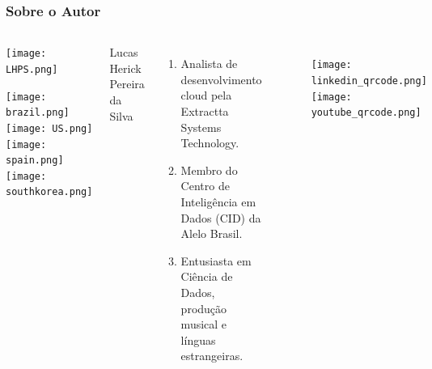 \documentclass[aspectratio=43,8pt]{beamer}%
\begin{document}
\begin{frame}
	\frametitle{Sobre o Autor}
	
	\begin{columns}
		
				
		\begin{center}
	
				\texttt{[image: LHPS.png]}\\
				
				\begin{minipage}{0.7\linewidth}
				\texttt{[image: brazil.png]}
				\hfill
				\texttt{[image: US.png]}
				\hfill
				\texttt{[image: spain.png]}
				\hfill
				\texttt{[image: southkorea.png]}
				\end{minipage}
		\end{center}
			
%		
	Lucas Herick Pereira da Silva
	
	\vspace{5mm}
	
		\begin{enumerate}
		\item Analista de desenvolvimento cloud pela Extractta Systems  Technology.
		\item Membro do Centro de Inteligência em Dados (CID) da Alelo Brasil.
		\item Entusiasta em Ciência de Dados, produção musical e línguas estrangeiras.
		\end{enumerate}
	
	\begin{figure}
		\centering
		\texttt{[image: linkedin\_qrcode.png]}
		\texttt{[image: youtube\_qrcode.png]}
	\end{figure}
	
	\end{columns}
\end{frame}
\end{document}
